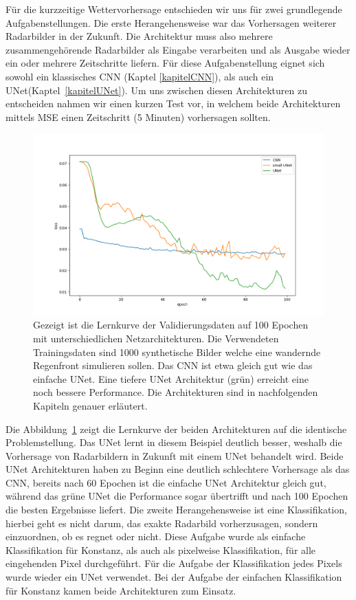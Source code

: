 Für die kurzzeitige Wettervorhersage entschieden wir uns für zwei grundlegende Aufgabenstellungen. Die erste Herangehensweise war das Vorhersagen weiterer Radarbilder in der Zukunft. Die Architektur muss also mehrere zusammengehörende Radarbilder als Eingabe verarbeiten und als Ausgabe wieder ein oder mehrere Zeitschritte liefern. Für diese Aufgabenstellung eignet sich sowohl ein klassisches CNN (Kaptel \ref{kapitelCNN}), als auch ein UNet(Kaptel~\ref{kapitelUNet}). Um uns zwischen diesen Architekturen zu entscheiden nahmen wir einen kurzen Test vor, in welchem beide Architekturen mittels MSE einen Zeitschritt (5 Minuten) vorhersagen sollten.
\begin{figure}[h]
	\centering
	\includegraphics[width=\linewidth]{pics/Syntetische_Daten_CNN_UNet.png}
	\caption[Lernkurven verschiedener Architekturen auf Syntetische Daten]{Gezeigt ist die Lernkurve der Validierungsdaten auf 100 Epochen mit unterschiedlichen Netzarchitekturen. Die Verwendeten Trainingsdaten sind 1000 synthetische Bilder welche eine wandernde Regenfront simulieren sollen. Das CNN ist etwa gleich gut wie das einfache UNet. Eine tiefere UNet Architektur (grün) erreicht eine noch bessere Performance. Die Architekturen sind in nachfolgenden Kapiteln genauer erläutert. }
	\label{imgCNNUNet}
\end{figure}

Die Abbildung~\ref{imgCNNUNet} zeigt die Lernkurve der beiden Architekturen auf die identische Problemstellung. Das UNet lernt in diesem Beispiel deutlich besser, weshalb die Vorhersage von Radarbildern in Zukunft mit einem UNet behandelt wird. Beide UNet Architekturen haben zu Beginn eine deutlich schlechtere Vorhersage als das CNN, bereits nach 60 Epochen ist die einfache UNet Architektur gleich gut, während das grüne UNet die Performance sogar übertrifft und nach 100 Epochen die besten Ergebnisse liefert.
\newline
Die zweite Herangehensweise ist eine Klassifikation, hierbei geht es nicht darum, das exakte Radarbild vorherzusagen, sondern einzuordnen, ob es regnet oder nicht. Diese Aufgabe wurde als einfache Klassifikation für Konstanz, als auch als pixelweise Klassifikation, für alle eingehenden Pixel durchgeführt. Für die Aufgabe der Klassifikation jedes Pixels wurde wieder ein UNet verwendet. Bei der Aufgabe der einfachen Klassifikation für Konstanz kamen beide Architekturen zum Einsatz.

